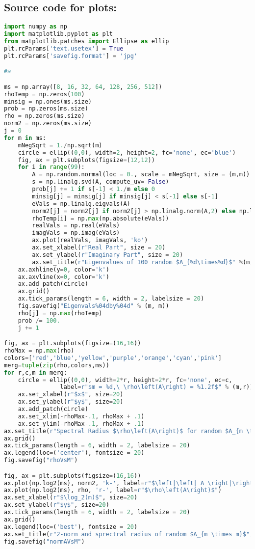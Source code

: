 \documentclass{article}
\begin{document}
\subsection*{Source code for plots:}
\begin{lstlisting}[language=python]
import numpy as np
import matplotlib.pyplot as plt
from matplotlib.patches import Ellipse as ellip
plt.rcParams['text.usetex'] = True
plt.rcParams['savefig.format'] = 'jpg'

#a

ms = np.array([8, 16, 32, 64, 128, 256, 512])
rhoTemp = np.zeros(100)
minsig = np.ones(ms.size)
prob = np.zeros(ms.size)
rho = np.zeros(ms.size)
norm2 = np.zeros(ms.size)
j = 0
for m in ms:
	mNegSqrt = 1./np.sqrt(m)
	circle = ellip((0,0), width=2, height=2, fc='none', ec='blue')
	fig, ax = plt.subplots(figsize=(12,12))
	for i in range(99):
		A = np.random.normal(loc = 0., scale = mNegSqrt, size = (m,m))
		s = np.linalg.svd(A, compute_uv= False)
		prob[j] += 1 if s[-1] < 1./m else 0
		minsig[j] = minsig[j] if minsig[j] < s[-1] else s[-1]
		eVals = np.linalg.eigvals(A)
		norm2[j] = norm2[j] if norm2[j] > np.linalg.norm(A,2) else np.linalg.norm(A,2)
		rhoTemp[i] = np.max(np.absolute(eVals))
		realVals = np.real(eVals)
		imagVals = np.imag(eVals)
		ax.plot(realVals, imagVals, 'ko')
		ax.set_xlabel(r"Real Part", size = 20)
		ax.set_ylabel(r"Imaginary Part", size = 20)
		ax.set_title(r"Eigenvalues of 100 random $A_{%d\times%d}$" %(m,m), size = 20)
	ax.axhline(y=0, color='k')
	ax.axvline(x=0, color='k')
	ax.add_patch(circle)
	ax.grid()
	ax.tick_params(length = 6, width = 2, labelsize = 20)
	fig.savefig("Eigenvals%04dby%04d" % (m, m))
	rho[j] = np.max(rhoTemp)
	prob /= 100.
	j += 1

fig, ax = plt.subplots(figsize=(16,16))
rhoMax = np.max(rho)
colors=['red','blue','yellow','purple','orange','cyan','pink']
merg=tuple(zip(rho,colors,ms))
for r,c,m in merg:
	circle = ellip((0,0), width=2*r, height=2*r, fc='none', ec=c, 
				label=r"$m = %d,\ \rho\left(A\right) = %1.2f$" % (m,r))
	ax.set_xlabel(r"$x$", size=20)
	ax.set_ylabel(r"$y$", size=20)
	ax.add_patch(circle)
	ax.set_xlim(-rhoMax-.1, rhoMax + .1)
	ax.set_ylim(-rhoMax-.1, rhoMax + .1)
ax.set_title(r"Spectral Radius $\rho\left(A\right)$ for random $A_{m \times m}$", size=20)
ax.grid()
ax.tick_params(length = 6, width = 2, labelsize = 20)
ax.legend(loc=('center'), fontsize = 20)
fig.savefig("rhoVsM")

fig, ax = plt.subplots(figsize=(16,16))
ax.plot(np.log2(ms), norm2, 'k-', label=r"$\left|\left| A \right|\right|_2$")
ax.plot(np.log2(ms), rho, 'r-', label=r"$\rho\left(A\right)$")
ax.set_xlabel(r"$\log_2(m)$", size=20)
ax.set_ylabel(r"$y$", size=20)
ax.tick_params(length = 6, width = 2, labelsize = 20)
ax.grid()
ax.legend(loc=('best'), fontsize = 20)
ax.set_title(r"2-norm and sprectral radius of random $A_{m \times m}$", size=20)
fig.savefig("normAVsM")


\end{lstlisting}
\end{document}
